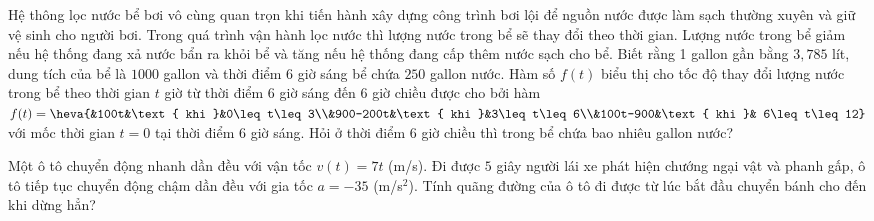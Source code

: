 \begin{bt}%
	Hệ thông lọc nước bể bơi vô cùng quan  trọn khi tiến hành xây dựng công trình bơi lội để nguồn nước được làm sạch thường xuyên và giữ vệ sinh cho người bơi. Trong quá trình vận hành lọc nước thì lượng nước trong bể sẽ thay đổi theo thời gian. Lượng nước trong bể giảm nếu hệ thống đang xả nước bẩn ra khỏi bể và tăng nếu hệ thống đang cấp thêm nước sạch cho bể. Biết rằng 1 gallon gần bằng $3{,}785$ lít, dung tích của bể là $1000$ gallon và thời điểm $6$ giờ sáng bể chứa $250$ gallon nước. Hàm số $f(t)$ biểu thị cho tốc độ thay đổi lượng nước trong bể theo thời gian $t$ giờ từ thời điểm $6$ giờ sáng đến $6$ giờ chiều được cho bởi hàm $f(t)=\heva{&100t&\text{ khi }&0\leq t\leq3\\&900-200t&\text{ khi }&3\leq t\leq6\\&100t-900&\text{ khi }& 6\leq t\leq 12}$ với mốc thời gian $t=0$ tại thời điểm $6$ giờ sáng. Hỏi ở thời điểm $6$ giờ chiều thì trong bể chứa bao nhiêu gallon nước?
\end{bt}

\begin{bt}%
	Một ô tô chuyển động nhanh dần đều với vận tốc $v(t)=7t$ (m/s). Đi được $5$ giây người lái xe phát hiện chướng ngại vật và phanh gấp,  ô tô tiếp tục chuyển động chậm dần đều với gia tốc $a=-35$ (m/s$^2$). Tính quãng đường của ô tô đi được từ lúc bắt đầu chuyển bánh cho đến khi dừng hẳn?
\end{bt}

